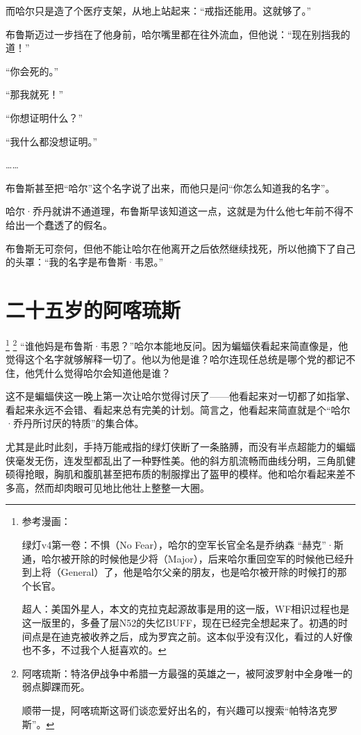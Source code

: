 \documentclass[../main]{subfiles}
\begin{document}
而哈尔只是造了个医疗支架，从地上站起来：“戒指还能用。这就够了。”

布鲁斯迈过一步挡在了他身前，哈尔嘴里都在往外流血，但他说：“现在别挡我的道！”

“你会死的。”

“那我就死！”

“你想证明什么？”

“我什么都没想证明。”

……

布鲁斯甚至把“哈尔”这个名字说了出来，而他只是问“你怎么知道我的名字”。

哈尔·乔丹就讲不通道理，布鲁斯早该知道这一点，这就是为什么他七年前不得不给出一个蠢透了的假名。

布鲁斯无可奈何，但他不能让哈尔在他离开之后依然继续找死，所以他摘下了自己的头罩：“我的名字是布鲁斯·韦恩。”

\section{二十五岁的阿喀琉斯}

\footnote[1]{参考漫画：

    绿灯v4第一卷：不惧（No Fear），哈尔的空军长官全名是乔纳森 “赫克”·斯通，哈尔被开除的时候他是少将（Major），后来哈尔重回空军的时候他已经升到上将（General）了，他是哈尔父亲的朋友，也是哈尔被开除的时候打的那个长官。

    超人：美国外星人，本文的克拉克起源故事是用的这一版，WF相识过程也是这一版里的，多叠了层N52的失忆BUFF，现在已经完全想起来了。初遇的时间点是在迪克被收养之后，成为罗宾之前。这本似乎没有汉化，看过的人好像也不多，不过我个人挺喜欢的。}
\footnote[2]{阿喀琉斯：特洛伊战争中希腊一方最强的英雄之一，被阿波罗射中全身唯一的弱点脚踝而死。

    顺带一提，阿喀琉斯这哥们谈恋爱好出名的，有兴趣可以搜索“帕特洛克罗斯”。}
“谁他妈是布鲁斯·韦恩？”哈尔本能地反问。因为蝙蝠侠看起来简直像是，他觉得这个名字就够解释一切了。他以为他是谁？哈尔连现任总统是哪个党的都记不住，他凭什么觉得哈尔会知道他是谁？

这不是蝙蝠侠这一晚上第一次让哈尔觉得讨厌了——他看起来对一切都了如指掌、看起来永远不会错、看起来总有完美的计划。简言之，他看起来简直就是个“哈尔·乔丹所讨厌的特质”的集合体。

尤其是此时此刻，手持万能戒指的绿灯侠断了一条胳膊，而没有半点超能力的蝙蝠侠毫发无伤，连发型都乱出了一种野性美。他的斜方肌流畅而曲线分明，三角肌健硕得抢眼，胸肌和腹肌甚至把布质的制服撑出了盔甲的模样。他和哈尔看起来差不多高，然而却肉眼可见地比他壮上整整一大圈。
\end{document}
